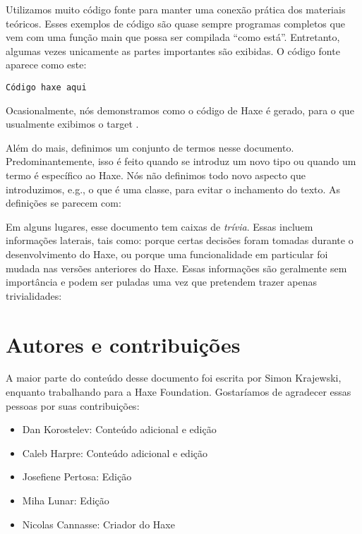 Utilizamos muito código fonte para manter uma conexão prática dos materiais teóricos. Esses exemplos de código são quase sempre programas completos que vem com uma função main que possa ser compilada ``como está''. Entretanto, algumas vezes unicamente as partes importantes são exibidas. O código fonte aparece como este:

\begin{lstlisting}
Código haxe aqui
\end{lstlisting}

Ocasionalmente, nós demonstramos como o código de Haxe é gerado, para o que usualmente exibimos o target .

Além do mais, definimos um conjunto de termos nesse documento. Predominantemente, isso é feito quando se introduz um novo tipo ou quando um termo é específico ao Haxe. Nós não definimos todo novo aspecto que introduzimos, e.g., o que é uma classe, para evitar o inchamento do texto. As definições se parecem com:


Em alguns lugares, esse documento tem caixas de \emph{trívia}. Essas incluem informações laterais, tais como: porque certas decisões foram tomadas durante o desenvolvimento do Haxe, ou porque uma funcionalidade em particular foi mudada nas versões anteriores do Haxe. Essas informações são geralmente sem importância e podem ser puladas uma vez que pretendem trazer apenas trivialidades:


\section{Autores e contribuições}
\label{introduction-authors-and-contributions}

A maior parte do conteúdo desse documento foi escrita por Simon Krajewski, enquanto trabalhando para a Haxe Foundation. Gostaríamos de agradecer essas pessoas por suas contribuições:

\begin{itemize}
	\item Dan Korostelev: Conteúdo adicional e edição
	\item Caleb Harpre: Conteúdo adicional e edição
	\item Josefiene Pertosa: Edição
	\item Miha Lunar: Edição
	\item Nicolas Cannasse: Criador do Haxe
\end{itemize}

